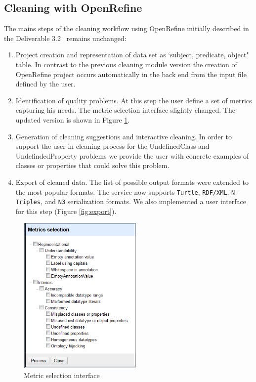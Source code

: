 \subsection{Cleaning with OpenRefine}
\label{sec:openrefine}

The mains steps of the cleaning workflow using OpenRefine initially described in the Deliverable 3.2~\cite{d3.2} remains unchanged:
\begin{enumerate}
\item Project creation and representation of data set as `subject, predicate, object" table. In contrast to the previous cleaning module version the creation of OpenRefine project
occurs automatically in the back end from the input file defined by the user. 
\item Identification of quality problems. At this step the user define a set of metrics capturing his needs. The metric selection interface slightly changed. The updated version is shown in Figure \ref{fig:metric_selection}.
\item Generation of cleaning suggestions and interactive cleaning. In order to support the user in cleaning process for the UndefinedClass and UndefindedProperty problems we provide the user with concrete examples of classes or properties that could solve this problem. 
\item Export of cleaned data. The list of possible output formats were extended to the most popular formats. The service now supports \texttt{Turtle}, \texttt{RDF/XML}, \texttt{N-Triples}, and \texttt{N3} serialization formats. We also implemented a user interface for this step (Figure \ref{fig:export}).
\end{enumerate}




\begin{figure}[ht!]
\centering
\includegraphics[width=6cm]{figures/MetricSelection.png}
\caption{Metric selection interface}
\label{fig:metric_selection}
\end{figure}



